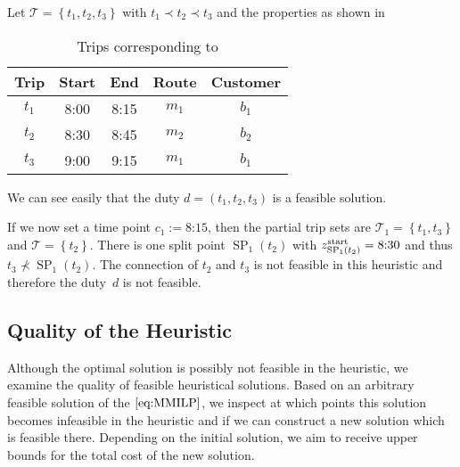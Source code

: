 \begin{example}
\label{ex:equivalence_MMILP_CMILP}

Let ${\mathcal{T}=\left\{t_1, t_2, t_3\right\}}$ with ${t_1\prec t_2\prec t_3}$ and the properties as shown in 

\begin{table}[htb]
	\centering
	\begin{tabular}{c|cccc}
		Trip & Start & End & Route & Customer \\
		\hline
		$t_1$ & 8:00 & 8:15 & $m_1$ & $b_1$ \\
		$t_2$ & 8:30 & 8:45 & $m_2$ & $b_2$ \\
		$t_3$ & 9:00 & 9:15 & $m_1$ & $b_1$ \\
	\end{tabular}
	\caption{Trips corresponding to }
	\label{tab:customer_heuristic_example}
\end{table}

We can see easily that the duty ${d=\left(t_1,t_2,t_3\right)}$ is a feasible solution. 

If we now set a time point ${c_1 := \text{8:15}}$, then the partial trip sets are ${\mathcal{T}_1=\left\{t_1,t_3\right\}}$ and ${\mathcal{T}=\left\{t_2\right\}}$. There is one split point ${\operatorname{SP}_1\left(t_2\right)}$ with ${z^{\operatorname{start}}_{\operatorname{SP}_1\left(t_2\right)} = \text{8:30}}$ and thus ${t_3\not\prec\operatorname{SP}_1\left(t_2\right)}$. The connection of $t_2$ and $t_3$ is not feasible in this heuristic and therefore the duty~$d$ is not feasible.

\end{example}


\subsection{Quality of the Heuristic}

Although the optimal solution is possibly not feasible in the heuristic, we examine the quality of feasible heuristical solutions. Based on an arbitrary feasible solution of the $\eqref{eq:MMILP}$, we inspect at which points this solution becomes infeasible in the heuristic and if we can construct a new solution which is feasible there. Depending on the initial solution, we aim to receive upper bounds for the total cost of the new solution. 

